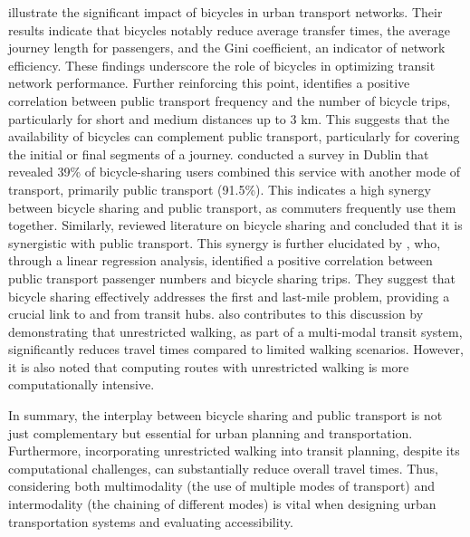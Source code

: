  illustrate the significant impact of bicycles in urban transport networks. 
Their results indicate that bicycles notably reduce average transfer times, the average journey length for passengers, and the Gini coefficient, an indicator of network efficiency. 
These findings underscore the role of bicycles in optimizing transit network performance.
Further reinforcing this point,  identifies a positive correlation between public transport frequency and the number of bicycle trips, particularly for short and medium distances up to 3 km. 
This suggests that the availability of bicycles can complement public transport, particularly for covering the initial or final segments of a journey.
 conducted a survey in Dublin that revealed 39\% of bicycle-sharing users combined this service with another mode of transport, primarily public transport (91.5\%). 
This indicates a high synergy between bicycle sharing and public transport, as commuters frequently use them together.
Similarly,  reviewed literature on bicycle sharing and concluded that it is synergistic with public transport.
This synergy is further elucidated by , who, through a linear regression analysis, identified a positive correlation between public transport passenger numbers and bicycle sharing trips. 
They suggest that bicycle sharing effectively addresses the first and last-mile problem, providing a crucial link to and from transit hubs.
 also contributes to this discussion by demonstrating that unrestricted walking, as part of a multi-modal transit system, significantly reduces travel times compared to limited walking scenarios.
However, it is also noted that computing routes with unrestricted walking is more computationally intensive.

In summary, the interplay between bicycle sharing and public transport is not just complementary but essential for urban planning and transportation.
Furthermore, incorporating unrestricted walking into transit planning, despite its computational challenges, can substantially reduce overall travel times.
Thus, considering both multimodality (the use of multiple modes of transport) and intermodality (the chaining of different modes) is vital when designing urban transportation systems and evaluating accessibility.
